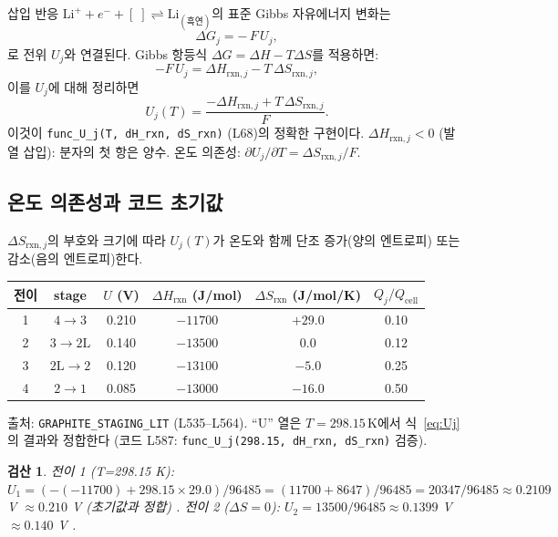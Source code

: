 \documentclass[11pt,a4paper]{article}
\newtheorem*{verifybox}{검산}
\newcommand{\cell}{\mathrm{cell}}
\begin{document}
삽입 반응 $\mathrm{Li}^++e^-+[\;]\rightleftharpoons\mathrm{Li}_{(\text{흑연})}$의
표준 Gibbs 자유에너지 변화는
\begin{equation}
  \Delta G_j = -\,F\,U_j,
  \label{eq:deltaG}
\end{equation}
로 전위 $U_j$와 연결된다.
Gibbs 항등식 $\Delta G = \Delta H - T\Delta S$를 적용하면:
\begin{equation}
  -F\,U_j = \Delta H_{\mathrm{rxn},j} - T\,\Delta S_{\mathrm{rxn},j},
\end{equation}
이를 $U_j$에 대해 정리하면
\begin{equation}
  \boxed{U_j(T) = \frac{-\Delta H_{\mathrm{rxn},j} + T\,\Delta S_{\mathrm{rxn},j}}{F}.}
  \label{eq:Uj}
\end{equation}
이것이 \texttt{func\_U\_j(T, dH\_rxn, dS\_rxn)} (L68)의 정확한 구현이다.
$\Delta H_{\mathrm{rxn},j} < 0$ (발열 삽입): 분자의 첫 항은 양수.
온도 의존성: $\partial U_j/\partial T = \Delta S_{\mathrm{rxn},j}/F$.

\subsection{온도 의존성과 코드 초기값}

$\Delta S_{\mathrm{rxn},j}$의 부호와 크기에 따라 $U_j(T)$가 온도와 함께
단조 증가(양의 엔트로피) 또는 감소(음의 엔트로피)한다.

\begin{center}
\renewcommand{\arraystretch}{1.3}
\begin{tabular}{cccccc}
\toprule
전이 & stage & $U$ (V) & $\Delta H_{\mathrm{rxn}}$ (J/mol) & $\Delta S_{\mathrm{rxn}}$ (J/mol/K)
  & $Q_j/Q_\cell$ \\
\midrule
1 & $4\!\to\!3$ & 0.210 & $-11700$ & $+29.0$ & 0.10 \\
2 & $3\!\to\!2\mathrm{L}$ & 0.140 & $-13500$ & $0.0$ & 0.12 \\
3 & $2\mathrm{L}\!\to\!2$ & 0.120 & $-13100$ & $-5.0$ & 0.25 \\
4 & $2\!\to\!1$ & 0.085 & $-13000$ & $-16.0$ & 0.50 \\
\bottomrule
\end{tabular}
\end{center}
출처: \texttt{GRAPHITE\_STAGING\_LIT} (L535--L564).
``U'' 열은 $T=298.15\,\mathrm{K}$에서 식~\eqref{eq:Uj}의 결과와 정합한다
(코드 L587: \texttt{func\_U\_j(298.15, dH\_rxn, dS\_rxn)} 검증).

\begin{verifybox}
전이 1 (T=298.15 K): $U_1 = (-(-11700)+298.15\times29.0)/96485
= (11700+8647)/96485 = 20347/96485 \approx 0.2109$ V
$\approx 0.210$ V (초기값과 정합) \checkmark.
전이 2 ($\Delta S=0$): $U_2 = 13500/96485 \approx 0.1399$ V $\approx 0.140$ V \checkmark.
\end{verifybox}
\end{document}
